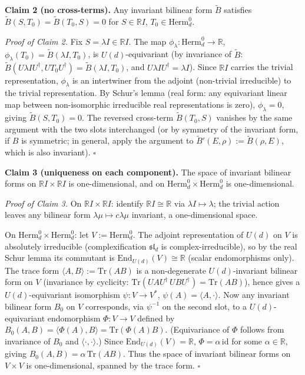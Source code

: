 \documentclass[
]{article}
\begin{document}
\textbf{Claim 2 (no cross-terms).} Any invariant bilinear form
\(\widetilde B\) satisfies \(\widetilde B(S,T_0)=\widetilde B(T_0,S)=0\)
for \(S\in\mathbb RI\), \(T_0\in\mathrm{Herm}_d^0\).

\emph{Proof of Claim 2.} Fix \(S=\lambda I\in\mathbb RI\). The map
\(\phi_\lambda:\mathrm{Herm}_d^0\to\mathbb R\),
\(\phi_\lambda(T_0)=\widetilde B(\lambda I,T_0)\), is
\(U(d)\)-equivariant (by invariance of \(\widetilde B\):
\(\widetilde B(U\lambda IU^\dagger,UT_0U^\dagger)=\widetilde B(\lambda I,T_0)\),
and \(U\lambda IU^\dagger=\lambda I\)). Since \(\mathbb RI\) carries the
trivial representation, \(\phi_\lambda\) is an intertwiner from the
adjoint (non-trivial irreducible) to the trivial representation. By
Schur's lemma (real form: any equivariant linear map between
non-isomorphic irreducible real representations is zero),
\(\phi_\lambda=0\), giving \(\widetilde B(S,T_0)=0\). The reversed
cross-term \(\widetilde B(T_0,S)\) vanishes by the same argument with
the two slots interchanged (or by symmetry of the invariant form, if
\(B\) is symmetric; in general, apply the argument to
\(\widetilde B'(E,\rho):=\widetilde B(\rho,E)\), which is also
invariant). \(\square\)

\textbf{Claim 3 (uniqueness on each component).} The space of invariant
bilinear forms on \(\mathbb RI\times\mathbb RI\) is one-dimensional, and
on \(\mathrm{Herm}_d^0\times\mathrm{Herm}_d^0\) is one-dimensional.

\emph{Proof of Claim 3.} On \(\mathbb RI\times\mathbb RI\): identify
\(\mathbb RI\cong\mathbb R\) via \(\lambda I\mapsto\lambda\); the
trivial action leaves any bilinear form
\(\lambda\mu\mapsto c\lambda\mu\) invariant, a one-dimensional space.

On \(\mathrm{Herm}_d^0\times\mathrm{Herm}_d^0\): let
\(V:=\mathrm{Herm}_d^0\). The adjoint representation of \(U(d)\) on
\(V\) is absolutely irreducible (complexification \(\mathfrak{sl}_d\) is
complex-irreducible), so by the real Schur lemma its commutant is
\(\mathrm{End}_{U(d)}(V)\cong\mathbb R\) (scalar endomorphisms only).
The trace form \(\langle A,B\rangle:=\mathrm{Tr}(AB)\) is a
non-degenerate \(U(d)\)-invariant bilinear form on \(V\) (invariance by
cyclicity: \(\mathrm{Tr}(UAU^\dagger\,UBU^\dagger)=\mathrm{Tr}(AB)\)),
hence gives a \(U(d)\)-equivariant isomorphism \(\psi:V\to V^*\),
\(\psi(A)=\langle A,\cdot\rangle\). Now any invariant bilinear form
\(B_0\) on \(V\) corresponds, via \(\psi^{-1}\) on the second slot, to a
\(U(d)\)-equivariant endomorphism \(\Phi:V\to V\) defined by
\(B_0(A,B)=\langle\Phi(A),B\rangle=\mathrm{Tr}(\Phi(A)B)\).
(Equivariance of \(\Phi\) follows from invariance of \(B_0\) and
\(\langle\cdot,\cdot\rangle\).) Since
\(\mathrm{End}_{U(d)}(V)=\mathbb R\), \(\Phi=\alpha\,\mathrm{id}\) for
some \(\alpha\in\mathbb R\), giving
\(B_0(A,B)=\alpha\,\mathrm{Tr}(AB)\). Thus the space of invariant
bilinear forms on \(V\times V\) is one-dimensional, spanned by the trace
form. \(\square\)
\end{document}
